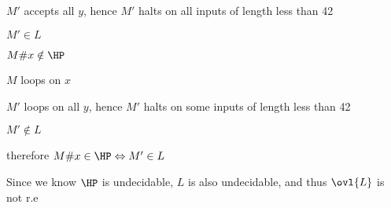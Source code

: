 \imp
$M'$ accepts all $y$, hence $M'$ halts on all inputs of length less than 42

\imp
$M' \in L$

$M\#x \notin \HP$

\imp
$M$ loops on $x$

\imp
$M'$ loops on all $y$, hence $M'$ halts on some inputs of length less than 42

\imp
$M' \notin L$


therefore $M\#x \in \HP \Leftrightarrow M' \in L $

Since we know $\HP$ is undecidable, $L$ is also undecidable, and thus $\ovl{L}$ is not r.e















